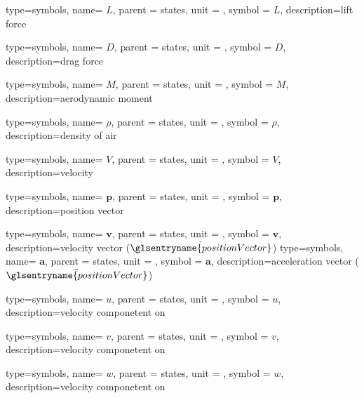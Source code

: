 {type=symbols,
	name= \ensuremath{L},
	parent = {states},
	unit = \unexpanded{\si{\newton}},
	symbol = \ensuremath{L},
	description={lift force}
}

{type=symbols,
	name= \ensuremath{D},
	parent = {states},
	unit = \unexpanded{\si{\newton}},
	symbol = \ensuremath{D},
	description={drag force}
}

{type=symbols,
	name= \ensuremath{M},
	parent = {states},
	unit = \unexpanded{\si{\newton\meter}},
	symbol = \ensuremath{M},
	description={aerodynamic moment}
}

{type=symbols,
	name= \ensuremath{\rho},
	parent = {states},
	unit = \unexpanded{\si{\kilogram\per\meter\cubed}},
	symbol = \ensuremath{\rho},
	description={density of air}
}

{type=symbols,
	name= \ensuremath{V},
	parent = {states},
	unit = \unexpanded{\si{\meter\per\second}},
	symbol = \ensuremath{V},
	description={velocity}
}

{type=symbols,
	name= \ensuremath{\mathbf{p}},
	parent = {states},
	unit = \unexpanded{\si{\meter}},
	symbol = \ensuremath{\mathbf{p}},
	description={position vector}
}

{type=symbols,
	name= \ensuremath{\mathbf{v}},
	parent = {states},
	unit = \unexpanded{\si{\meter\per\second}},
	symbol = \ensuremath{\mathbf{v}},
	description={velocity vector ($\dot{\glsentryname{positionVector}}$)}
}
{type=symbols,
	name= \ensuremath{\mathbf{a}},
	parent = {states},
	unit = \unexpanded{\si{\meter\per\second\squared}},
	symbol = \ensuremath{\mathbf{a}},
	description={acceleration vector ($\ddot{\glsentryname{positionVector}}$)}
}


{type=symbols,
	name= \ensuremath{u},
	parent = {states},
	unit = \unexpanded{\si{\meter\per\second}},
	symbol = \ensuremath{u},
	description={velocity componetent on }
}

{type=symbols,
	name= \ensuremath{v},
	parent = {states},
	unit = \unexpanded{\si{\meter\per\second}},
	symbol = \ensuremath{v},
	description={velocity componetent on }
}

{type=symbols,
	name= \ensuremath{w},
	parent = {states},
	unit = \unexpanded{\si{\meter\per\second}},
	symbol = \ensuremath{w},
	description={velocity componetent on }
}

